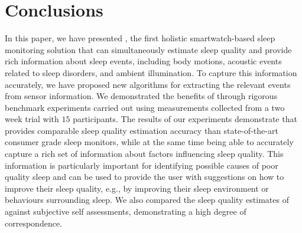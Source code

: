 
\section{Conclusions}

In this paper, we have presented \systemname, the first holistic smartwatch-based sleep monitoring solution that can simultaneously
estimate sleep quality and provide rich information about sleep events, including body motions, acoustic events related to sleep disorders,
and ambient illumination. To capture this information accurately, we have proposed new algorithms for extracting the relevant events from
sensor information. We demonstrated the benefits of \systemname through rigorous benchmark experiments carried out using measurements
collected from a two week trial with $15$ participants. The results of our experiments demonstrate that \systemname provides comparable
sleep quality estimation accuracy than state-of-the-art consumer grade sleep monitors, while at the same time being able to accurately
capture a rich set of information about factors influencing sleep quality. This information is particularly important for identifying
possible causes of poor quality sleep and can be used to provide the user with suggestions on how to improve their sleep quality, e.g., by
improving their sleep environment or behaviours surrounding sleep. We also compared the sleep quality estimates of \systemname against
subjective self assessments, demonstrating a high degree of correspondence.

